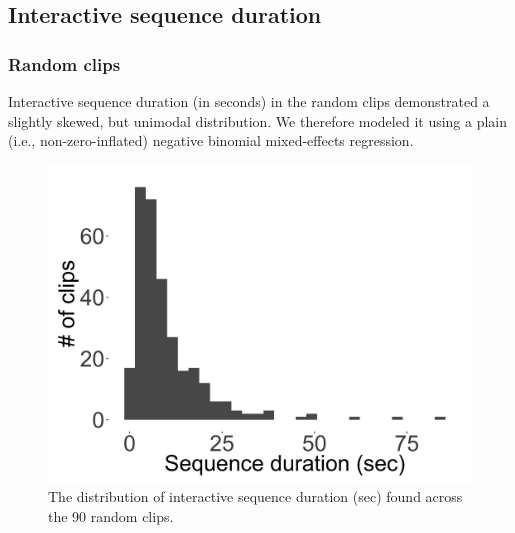 \documentclass[floatsintext,man]{apa6}
\theoremstyle{definition}
\theoremstyle{definition}
\theoremstyle{definition}
\theoremstyle{remark}
\begin{document}
\FloatBarrier

\subsection{Interactive sequence duration}\label{models-seqdur}

\subsubsection{Random clips}\label{models-seqdur-random}

Interactive sequence duration (in seconds) in the random clips
demonstrated a slightly skewed, but unimodal distribution. We therefore
modeled it using a plain (i.e., non-zero-inflated) negative binomial
mixed-effects regression.

\FloatBarrier

\begin{figure}[H]

{\centering \includegraphics[width=0.4\linewidth]{www/seqdur_random_distribution} 

}

\caption{The distribution of interactive sequence duration (sec) found across the 90 random clips.}\label{fig:fig25}
\end{figure}

\FloatBarrier
\end{document}
